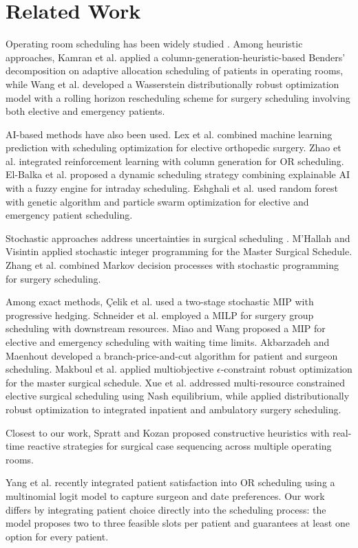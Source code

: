 \section{Related Work}

Operating room scheduling has been widely studied \cite{AlAmin2024}. Among heuristic approaches, Kamran et al. \cite{Kamran2020} applied a column-generation-heuristic-based Benders' decomposition on adaptive allocation scheduling of patients in operating rooms, while Wang et al. \cite{Wang2024} developed a Wasserstein distributionally robust optimization model with a rolling horizon rescheduling scheme for surgery scheduling involving both elective and emergency patients.

AI-based methods have also been used. Lex et al. \cite{Lex2025} combined machine learning prediction with scheduling optimization for elective orthopedic surgery. Zhao et al. \cite{Zhao2025} integrated reinforcement learning with column generation for OR scheduling. El-Balka et al. \cite{ElBalka2025} proposed a dynamic scheduling strategy combining explainable AI with a fuzzy engine for intraday scheduling. Eshghali et al. \cite{Eshghali2024} used random forest with genetic algorithm and particle swarm optimization for elective and emergency patient scheduling.

Stochastic approaches address uncertainties in surgical scheduling \cite{Bernardelli2024}. M'Hallah and Visintin \cite{MHallah2019} applied stochastic integer programming for the Master Surgical Schedule. Zhang et al. \cite{Zhang2021} combined Markov decision processes with stochastic programming for surgery scheduling.

Among exact methods, Çelik et al. \cite{Celik2023} used a two-stage stochastic MIP with progressive hedging. Schneider et al. \cite{Schneider2020} employed a MILP for surgery group scheduling with downstream resources. Miao and Wang \cite{Miao2021} proposed a MIP for elective and emergency scheduling with waiting time limits. Akbarzadeh and Maenhout \cite{Akbarzadeh2025} developed a branch-price-and-cut algorithm for patient and surgeon scheduling. Makboul et al. \cite{Makboul2025} applied multiobjective $\epsilon$-constraint robust optimization for the master surgical schedule.
Xue et al. \cite{Nash2025} addressed multi-resource constrained elective surgical scheduling using Nash equilibrium, while \cite{IntegratedRobust2025} applied distributionally robust optimization to integrated inpatient and ambulatory surgery scheduling.

Closest to our work, Spratt and Kozan \cite{Spratt2019} proposed constructive heuristics with real-time reactive strategies for surgical case sequencing across multiple operating rooms.


Yang et al. \cite{Yang2025} recently integrated patient satisfaction into OR scheduling using a multinomial logit model to capture surgeon and date preferences. Our work differs by integrating patient choice directly into the scheduling process: the model proposes two to three feasible slots per patient and guarantees at least one option for every patient.
